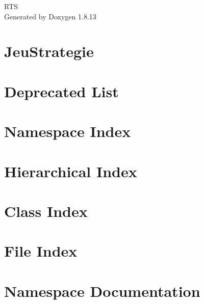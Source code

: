\documentclass[twoside]{book}
\newcommand{\+}{\discretionary{\mbox{\scriptsize$\hookleftarrow$}}{}{}}
\newcommand{\clearemptydoublepage}{%
  \newpage{\pagestyle{empty}\cleardoublepage}%
}
\begin{document}
\hypersetup{pageanchor=false,
             bookmarksnumbered=true,
             pdfencoding=unicode
            }
\begin{titlepage}
\vspace*{7cm}
\begin{center}%
{\Large R\+TS }\\
\vspace*{1cm}
{\large Generated by Doxygen 1.8.13}\\
\end{center}
\end{titlepage}
\clearemptydoublepage
{}
\tableofcontents
\clearemptydoublepage
{}
\hypersetup{pageanchor=true}

\chapter{Jeu\+Strategie}
\label{md__r_e_a_d_m_e}

\chapter{Deprecated List}
\label{deprecated}

\chapter{Namespace Index}

\chapter{Hierarchical Index}

\chapter{Class Index}

\chapter{File Index}

\chapter{Namespace Documentation}





\end{document}
